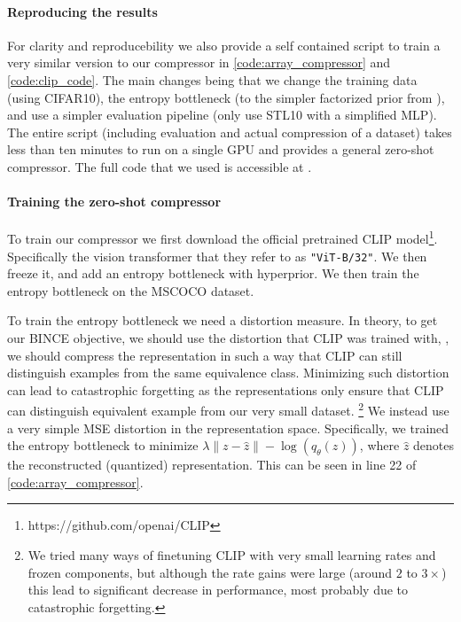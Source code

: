 \documentclass[final]{article}
\begin{document}
\paragraph{Reproducing the results}
For clarity and reproducebility we also provide a self contained script to train a very similar version to our compressor in \cref{code:array_compressor} and \cref{code:clip_code}.
The main changes being that we change the training data (using CIFAR10), the entropy bottleneck (to the simpler factorized prior from \cite{balle_variational_2018}), and use a simpler evaluation pipeline (only use STL10 with a simplified MLP).
The entire script (including evaluation and actual compression of a dataset) takes less than ten minutes to run on a single GPU and provides a general zero-shot compressor.
The full code that we used is accessible at \codeurl{}.

\paragraph{Training the zero-shot compressor}
To train our compressor we first download the official pretrained CLIP model\footnote{https://github.com/openai/CLIP}.
Specifically the vision transformer \cite{dosovitskiy_image_2020} that they refer to as \texttt{"ViT-B/32"}.
We then freeze it, and add an entropy bottleneck with  hyperprior.
We then train the entropy bottleneck on the MSCOCO dataset.

To train the entropy bottleneck we need a distortion measure.
In theory, to get our BINCE objective, we should use the distortion that CLIP was trained with, \ie, we should compress the representation in such a way that CLIP can still distinguish examples from the same equivalence class. Minimizing such distortion can lead to catastrophic forgetting as the representations only ensure that CLIP can distinguish equivalent example from our very small dataset. \footnote{We tried many ways of finetuning CLIP with very small learning rates and frozen components, but although the rate gains were large (around $2$ to $3\times$) this lead to significant decrease in performance, most probably due to catastrophic forgetting.}
We instead use a very simple MSE distortion in the representation space.
Specifically, we trained the entropy bottleneck to minimize $\lambda \| z - \hat{z} \| - \log(q_\theta(z))$, where $\hat{z}$ denotes the reconstructed (quantized) representation.
This can be seen in line 22 of \cref{code:array_compressor}.
\end{document}
